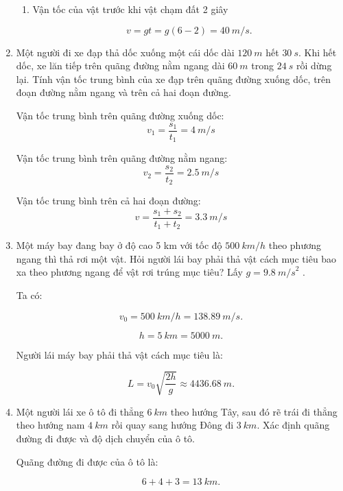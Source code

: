 \begin{enumerate}[label=\bfseries Câu \arabic*:]
{\begin{enumerate}
		$$s_6 = \dfrac{1}{2} g(6^2 - 5^2) = \SI{55}{m}.$$
		
		\item Vận tốc của vật trước khi vật chạm đất 2 giây
		
		$$v = gt = g(6-2) = \SI{40}{m/s}.$$
	\end{enumerate}
	}
	
	\item {}
	
	
	{Một người đi xe đạp thả dốc xuống một cái dốc dài $\SI{120}{m}$ hết $\SI{30}{s}$. Khi hết dốc, xe lăn tiếp trên quãng đường nằm ngang dài $\SI{60}{m}$ trong $\SI{24}{s}$ rồi dừng lại. Tính vận tốc trung bình của xe đạp trên quãng đường xuống dốc, trên đoạn đường nằm ngang và trên cả hai đoạn đường.
	}
	
	\hideall
	{Vận tốc trung bình trên quãng đường xuống dốc:
		$$v_1 = \dfrac{s_1}{t_1} = \SI{4}{m/s}$$
		
		Vận tốc trung bình trên quãng đường nằm ngang:
		$$v_2 = \dfrac{s_2}{t_2} = \SI{2.5}{m/s}$$
		
		Vận tốc trung bình trên cả hai đoạn đường:
		$$v= \dfrac{s_1 + s_2}{t_1 + t_2} = \SI{3.3}{m/s}$$
	}
		\item {}
	
	
	{
		Một máy bay đang bay ở độ cao 5 km với tốc độ $\SI{500}{km/h}$ theo phương ngang thì thả rơi một vật. Hỏi người lái bay phải thả vật cách mục tiêu bao xa theo phương ngang để vật rơi trúng mục tiêu? Lấy $g = \SI{9,8}{m/s}^2$ .
		
		
	}
	
	\hideall
	{
		Ta có:
		
		$$v_0 = \SI{500}{km/h} = \SI{138,89}{m/s}.$$
		
		$$h = \SI{5}{km} = \SI{5000}{m}.$$
		
		Người lái máy bay phải thả vật cách mục tiêu là:
		
		$$L = v_0 \sqrt{\dfrac{2h}{g}} \approx \SI{4436,68}{m}.$$
		
		
	}
		\item {}
	
	
	{
		Một người lái xe ô tô đi thẳng $\SI{6}{km}$ theo hướng Tây, sau đó rẽ trái đi thẳng theo hướng nam $\SI{4}{km}$ rồi quay sang hướng Đông đi $\SI{3}{km}$. Xác định quãng đường đi được và độ dịch chuyển của ô tô.
	}
	
	\hideall
	{
		Quãng đường đi được của ô tô là: 
		
		$$6 + 4 + 3 = \SI{13}{km}.$$
		

}
\end{enumerate}
